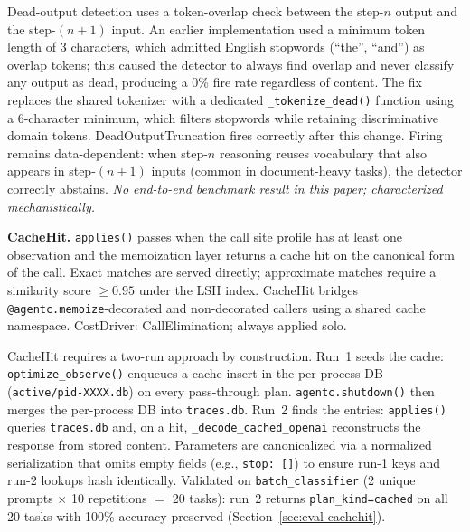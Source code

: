 \documentclass[sigconf,9pt]{acmart}
\begin{document}
Dead-output detection uses a token-overlap check between the step-$n$ output and
the step-$(n+1)$ input. An earlier implementation used a minimum token length of
3 characters, which admitted English stopwords (``the'', ``and'') as overlap
tokens; this caused the detector to always find overlap and never classify any
output as dead, producing a 0\% fire rate regardless of content. The fix replaces
the shared tokenizer with a dedicated \texttt{\_tokenize\_dead()} function using a
6-character minimum, which filters stopwords while retaining discriminative domain
tokens. DeadOutputTruncation fires correctly after this change. Firing remains
data-dependent: when step-$n$ reasoning reuses vocabulary that also appears in
step-$(n+1)$ inputs (common in document-heavy tasks), the detector correctly
abstains. \textit{No end-to-end benchmark result in this paper; characterized
mechanistically.}

\textbf{CacheHit.} \texttt{applies()} passes when the call site profile has at least
one observation and the memoization layer returns a cache hit on the canonical form of
the call. Exact matches are served directly; approximate matches require a similarity
score $\geq 0.95$ under the LSH index. CacheHit bridges
\texttt{@agentc.memoize}-decorated and non-decorated callers using a shared cache
namespace. CostDriver: CallElimination; always applied solo.

CacheHit requires a two-run approach by construction. Run~1 seeds the cache:
\texttt{optimize\_observe()} enqueues a cache insert in the per-process DB
(\texttt{active/pid-XXXX.db}) on every pass-through plan. \texttt{agentc.shutdown()}
then merges the per-process DB into \texttt{traces.db}. Run~2 finds the entries:
\texttt{applies()} queries \texttt{traces.db} and, on a hit, \texttt{\_decode\_cached\_openai}
reconstructs the response from stored content. Parameters are canonicalized via a
normalized serialization that omits empty fields (e.g., \texttt{stop:~[]}) to
ensure run-1 keys and run-2 lookups hash identically. Validated on
\texttt{batch\_classifier} (2 unique prompts $\times$ 10 repetitions $=$ 20 tasks):
run~2 returns \texttt{plan\_kind=cached} on all 20 tasks with 100\% accuracy
preserved (Section~\ref{sec:eval-cachehit}).
\end{document}
